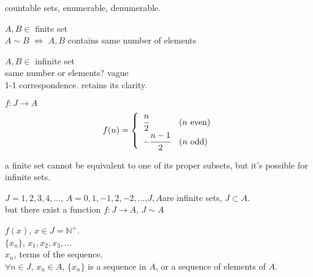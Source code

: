 
countable sets, enumerable, denumerable.

$A, B \in$ finite set\\
$A\sim B$ $\Longleftrightarrow$ $A, B$ contains same number of elements

$A, B \in$ infinite set\\
same number or elements? vague\\
1-1 correspondence. retains its clarity.

\begin{myExample}
    $f:J\rightarrow A$
    \begin{equation*}
        f(n) = \left\{
            \begin{array}{ll}
                \cfrac{n}{2} & (n \text{  even})\\
                -\cfrac{n-1}{2} & (n \text{  odd})
            \end{array}
        \right.
    \end{equation*}
\end{myExample}

\begin{myRemark}
    a finite set cannot be equivalent to one of its proper subsets, but it's possible for infinite sets.
\end{myRemark}

$J = 1,2,3,4,...$, $A = 0,1,-1,2,-2,...$,$J, A$are infinite sets, $J \subset A$.\\
but there exist a function $f:J\rightarrow A$, $J \sim A$

\begin{mydef}
    \label{mydef:2.7}
    $f(x)$, $x\in J = \mathbb{N}^+$.\\
    $\{x_n\}$, $x_1,x_2,x_3,...$\\
    $x_n$, terms of the sequence.\\
    $\forall n\in J$, $x_n\in A$, $\{x_n\}$ is a sequence in $A$, or a sequence of elements of $A$.
\end{mydef}

